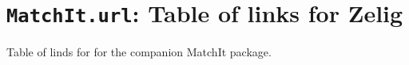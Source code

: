  \section{{\tt MatchIt.url}: Table of links for Zelig}\label{ss:MatchIt.url}
\begin{Description}\relax
Table of linds for  for the companion MatchIt package.
\end{Description}


